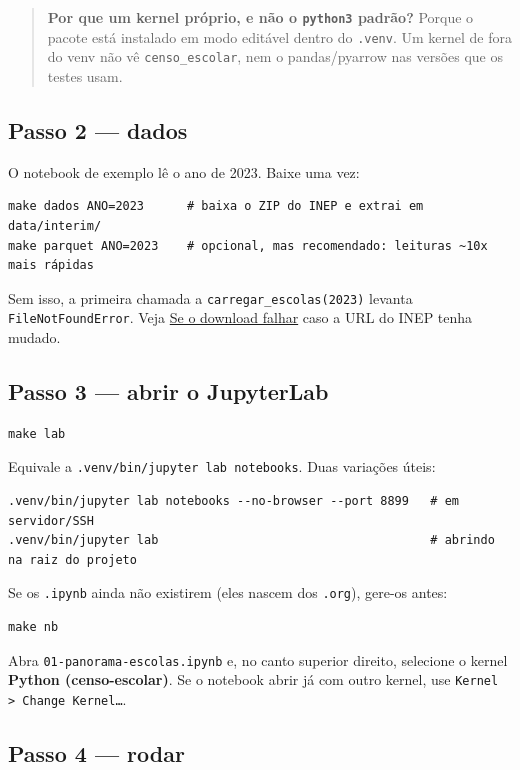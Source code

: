 \documentclass[11pt]{article}
\begin{document}
\begin{quote}
\textbf{Por que um kernel próprio, e não o \texttt{python3} padrão?} Porque o pacote está
instalado em modo editável dentro do \texttt{.venv}. Um kernel de fora do venv não vê
\texttt{censo\_escolar}, nem o pandas/pyarrow nas versões que os testes usam.
\end{quote}
\subsection*{Passo 2 — dados}
\label{sec:org7377c72}

O notebook de exemplo lê o ano de 2023. Baixe uma vez:

\begin{verbatim}
make dados ANO=2023      # baixa o ZIP do INEP e extrai em data/interim/
make parquet ANO=2023    # opcional, mas recomendado: leituras ~10x mais rápidas
\end{verbatim}

Sem isso, a primeira chamada a \texttt{carregar\_escolas(2023)} levanta
\texttt{FileNotFoundError}. Veja \hyperref[sec:org4106759]{Se o download falhar} caso a URL do INEP tenha mudado.
\subsection*{Passo 3 — abrir o JupyterLab}
\label{sec:orge1c06ad}

\begin{verbatim}
make lab
\end{verbatim}

Equivale a \texttt{.venv/bin/jupyter lab notebooks}. Duas variações úteis:

\begin{verbatim}
.venv/bin/jupyter lab notebooks --no-browser --port 8899   # em servidor/SSH
.venv/bin/jupyter lab                                      # abrindo na raiz do projeto
\end{verbatim}

Se os \texttt{.ipynb} ainda não existirem (eles nascem dos \texttt{.org}), gere-os antes:

\begin{verbatim}
make nb
\end{verbatim}

Abra \texttt{01-panorama-escolas.ipynb} e, no canto superior direito, selecione o
kernel \textbf{Python (censo-escolar)}. Se o notebook abrir já com outro kernel, use
\texttt{Kernel > Change Kernel…}.
\subsection*{Passo 4 — rodar}
\label{sec:org5f9b13d}
\end{document}
